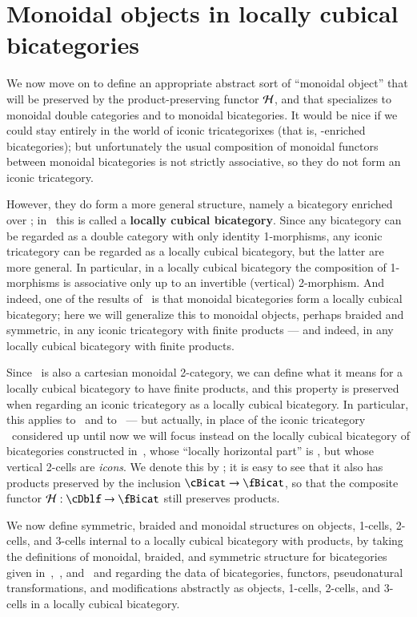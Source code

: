 \section{Monoidal objects in locally cubical bicategories}
\label{sec:mono-objects}

We now move on to define an appropriate abstract sort of ``monoidal object'' that will be preserved by the product-preserving functor $\mathcal{H}$, and that specializes to monoidal double categories and to monoidal bicategories.
It would be nice if we could stay entirely in the world of iconic tricategorixes (that is, \Icon-enriched bicategories); but unfortunately the usual composition of monoidal functors between monoidal bicategories is not strictly associative, so they do not form an iconic tricategory.

However, they do form a more general structure, namely a bicategory enriched over \cDbl; in~\cite{gg:ldstr-tricat} this is called a \textbf{locally cubical bicategory}.
Since any bicategory can be regarded as a double category with only identity 1-morphisms, any iconic tricategory can be regarded as a locally cubical bicategory, but the latter are more general.
In particular, in a locally cubical bicategory the composition of 1-morphisms is associative only up to an invertible (vertical) 2-morphism.
And indeed, one of the results of~\cite{gg:ldstr-tricat} is that monoidal bicategories form a locally cubical bicategory; here we will generalize this to monoidal objects, perhaps braided and symmetric, in any iconic tricategory with finite products --- and indeed, in any locally cubical bicategory with finite products.

Since \cDbl\ is also a cartesian monoidal 2-category, we can define what it means for a locally cubical bicategory to have finite products, and this property is preserved when regarding an iconic tricategory as a locally cubical bicategory.
In particular, this applies to \cDblf\ and to \cBicat\ --- but actually, in place of the iconic tricategory \cBicat\ considered up until now we will focus instead on the locally cubical bicategory of bicategories constructed in~\cite{gg:ldstr-tricat}, whose ``locally horizontal part'' is \cBicat, but whose vertical 2-cells are \emph{icons}.
We denote this by \fBicat; it is easy to see that it also has products preserved by the inclusion $\cBicat\to \fBicat$, so that the composite functor $\cH : \cDblf \to\fBicat$ still preserves products.

We now define symmetric, braided and monoidal structures on objects, 1-cells, 2-cells, and 3-cells internal to a locally cubical bicategory with products, by taking the definitions of monoidal, braided, and symmetric structure for bicategories given in~\cite{nick:tricatsbook},~\cite{mccrudden:bal-coalgb}, and~\cite{gg:ldstr-tricat} and regarding the data of bicategories, functors, pseudonatural transformations, and modifications abstractly as objects, 1-cells, 2-cells, and 3-cells in a locally cubical bicategory.

